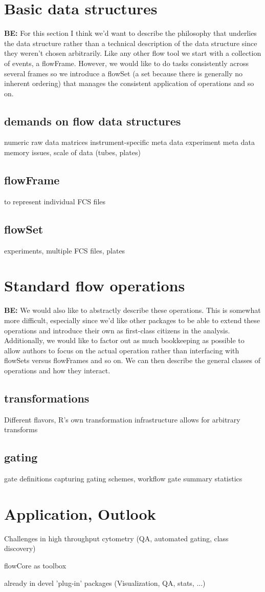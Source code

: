 \documentclass[12pt]{article}
\begin{document}
\section{Basic data structures}

{\bf BE:} For this section I think we'd want to describe the philosophy that
underlies the data structure rather than a technical description of
the data structure since they weren't chosen arbitrarily. Like any
other flow tool we start with a collection of events, a flowFrame.
However, we would like to do tasks consistently across several frames
so we introduce a flowSet (a set because there is generally no
inherent ordering) that manages the consistent application of
operations and so on.

\subsection{demands on flow data structures}
numeric raw data matrices
instrument-specific meta data
experiment meta data
memory issues, scale of data (tubes, plates)

\subsection{flowFrame}
to represent individual FCS files

\subsection{flowSet} 
experiments, multiple FCS files, plates


\section{Standard flow operations}
{\bf BE:} We would also like to abstractly describe these operations. This is
somewhat more difficult, especially since we'd like other packages to
be able to extend these operations and introduce their own as
first-class citizens in the analysis. Additionally, we would like to
factor out as much bookkeeping as possible to allow authors to focus
on the actual operation rather than interfacing with flowSets versus
flowFrames and so on. We can then describe the general classes of
operations and how they interact.

\subsection{transformations}
Different flavors, R's own transformation infrastructure allows for
arbitrary transforms

\subsection{gating}
gate definitions
capturing gating schemes, workflow
gate summary statistics


\section{Application, Outlook}
Challenges in high throughput cytometry
(QA, automated gating, class discovery) 

flowCore as toolbox

already in devel 'plug-in' packages (Visualization, QA, stats, ...)
\end{document}
